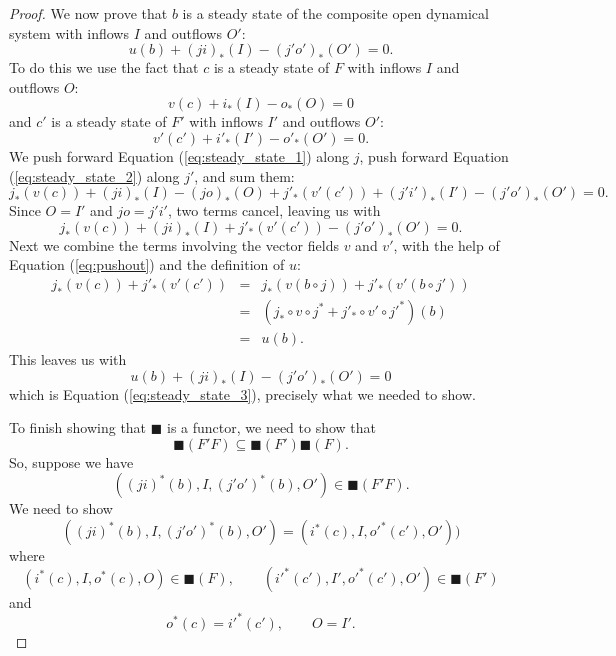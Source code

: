 \documentclass{compositionalityarticle}
\theoremstyle{compositionality}
\theoremstyle{remark}
\begin{document}
\begin{proof}
We now prove that $b$ is a steady state of the composite open dynamical system with
inflows $I$ and outflows $O'$:
\begin{equation}
\label{eq:steady_state_3}
   u(b) + (ji)_*(I) - (j'o')_*(O') = 0.
\end{equation}
To do this we use the fact that $c$ is a steady state of $F$ with inflows $I$ and outflows $O$:
\begin{equation}
\label{eq:steady_state_1}
   v(c) + i_*(I) - {o}_*(O) = 0
\end{equation}
and $c'$ is a steady state of $F'$ with inflows $I'$ and outflows $O'$:
\begin{equation}
\label{eq:steady_state_2}
   v'(c') + {i'}_*(I') - {o'}_*(O') = 0.
\end{equation}
We push forward Equation (\ref{eq:steady_state_1}) along $j$, push forward Equation
(\ref{eq:steady_state_2}) along $j'$, and sum them:
\[   j_*(v(c))  + (ji)_*(I) - (jo)_*(O) + j'_*(v'(c')) + (j'i')_*(I') - (j'o')_*(O') = 0. \]
Since $O = I'$ and $jo = j'i'$, two terms cancel, leaving us with
\[     j_*(v(c))  + (ji)_*(I) + j'_*(v'(c')) - (j'o')_*(O') = 0. \]
Next we combine the terms involving the vector fields $v$ and $v'$, with the help of Equation (\ref{eq:pushout}) and the definition of $u$:
\begin{equation}
\label{eq:u}
   \begin{array}{ccl}
  j_*(v(c)) + j'_*(v'(c')) &=& j_*(v(b \circ j)) + j'_*(v'(b \circ j')) \\
                                    &=& (j_* \circ v \circ j^* + j'_* \circ v' \circ j'^*)(b) \\
                                    &=& u(b)  .
\end{array}
\end{equation}
This leaves us with
\[         u(b) +  (ji)_*(I) - (j'o')_*(O') = 0 \]
which is Equation (\ref{eq:steady_state_3}), precisely what we needed to show.

To finish showing that $\blacksquare$ is a functor, we need to show that 
\[   \blacksquare(F'F) \subseteq \blacksquare(F') \blacksquare(F)  .\] 
So, suppose we have 
\[    ((ji)^*(b), I, {(j'o')}^*(b), O') \in \blacksquare(F'F) .\]
We need to show
\begin{equation}
\label{eq:composite}
  ((ji)^*(b), I, {(j'o')}^*(b), O') = (i^*(c),I,{o'}^*(c'),O')) 
\end{equation}
where 
\[     (i^*(c),I,o^*(c),O) \in \blacksquare(F), \qquad  ({i'}^*(c'),I',{o'}^*(c'),O') \in \blacksquare(F') \]
and
\[   o^*(c) = {i'}^*(c'), \qquad O = I' .\]


\end{proof}
\end{document}
